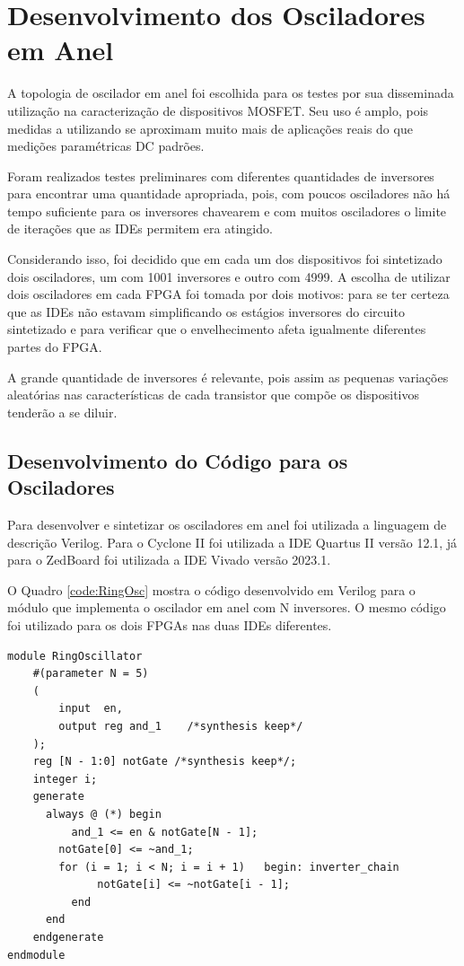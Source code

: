 \section{Desenvolvimento dos Osciladores em Anel}

A topologia de oscilador em anel foi escolhida para os testes por sua disseminada utilização na caracterização de dispositivos MOSFET. Seu uso é amplo, pois medidas a utilizando se aproximam muito mais de aplicações reais do que medições paramétricas DC padrões.

Foram realizados testes preliminares com diferentes quantidades de inversores para encontrar uma quantidade apropriada, pois, com poucos osciladores não há tempo suficiente para os inversores chavearem e com muitos osciladores o limite de iterações que as IDEs permitem era atingido.

Considerando isso, foi decidido que em cada um dos dispositivos foi sintetizado dois osciladores, um com 1001 inversores e outro com 4999. A escolha de utilizar dois osciladores em cada FPGA foi tomada por dois motivos: para se ter certeza que as IDEs não estavam simplificando os estágios inversores do circuito sintetizado e para verificar que o envelhecimento afeta igualmente diferentes partes do FPGA.

A grande quantidade de inversores é relevante, pois assim as pequenas variações aleatórias nas características de cada transistor que compõe os dispositivos tenderão a se diluir.

\subsection{Desenvolvimento do Código para os Osciladores}

Para desenvolver e sintetizar os osciladores em anel foi utilizada a linguagem de descrição Verilog. Para o Cyclone II foi utilizada a IDE Quartus II versão 12.1, já para o ZedBoard foi utilizada a IDE Vivado versão 2023.1.

O Quadro \ref{code:RingOsc} mostra o código desenvolvido em Verilog para o módulo que implementa o oscilador em anel com N inversores. O mesmo código foi utilizado para os dois FPGAs nas duas IDEs diferentes.

\begin{lstlisting}[label={code:RingOsc}, style=VerilogStyle, caption={Módulo do Oscilador em Anel. Fonte: O Autor}]
module RingOscillator 
	#(parameter N = 5)
	(
		input  en,
		output reg and_1    /*synthesis keep*/
	);
	reg [N - 1:0] notGate /*synthesis keep*/;
	integer i;
	generate
	  always @ (*) begin
		  and_1 <= en & notGate[N - 1];
	  	notGate[0] <= ~and_1;
	  	for (i = 1; i < N; i = i + 1)   begin: inverter_chain
			  notGate[i] <= ~notGate[i - 1];
		  end
	  end
	endgenerate
endmodule
\end{lstlisting}

